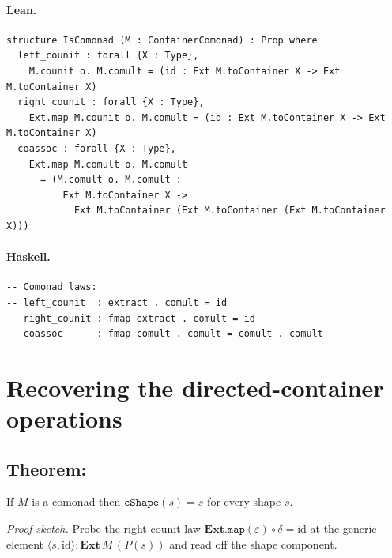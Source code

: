 \documentclass[11pt,a4paper]{article}
\begin{document}
\paragraph{Lean.}
\begin{lstlisting}[style=lean]
structure IsComonad (M : ContainerComonad) : Prop where
  left_counit : forall {X : Type},
    M.counit o. M.comult = (id : Ext M.toContainer X -> Ext M.toContainer X)
  right_counit : forall {X : Type},
    Ext.map M.counit o. M.comult = (id : Ext M.toContainer X -> Ext M.toContainer X)
  coassoc : forall {X : Type},
    Ext.map M.comult o. M.comult
      = (M.comult o. M.comult :
          Ext M.toContainer X ->
            Ext M.toContainer (Ext M.toContainer (Ext M.toContainer X)))
\end{lstlisting}

\paragraph{Haskell.}
\begin{lstlisting}[style=haskell]
-- Comonad laws:
-- left_counit  : extract . comult = id
-- right_counit : fmap extract . comult = id
-- coassoc      : fmap comult . comult = comult . comult
\end{lstlisting}


\section{Recovering the directed-container operations}

\subsection{Theorem: }

\begin{thm}[The linchpin: $\mathtt{cShape} = \mathrm{id}$]
If $M$ is a comonad then $\mathtt{cShape}(s) = s$ for every shape $s$.

\emph{Proof sketch.}  Probe the right counit law
$\mathbf{Ext}.\mathtt{map}(\varepsilon) \circ \delta = \mathrm{id}$
at the generic element $\langle s, \mathrm{id} \rangle : \mathbf{Ext}\,M\,(P(s))$
and read off the shape component.
\end{thm}
\end{document}
